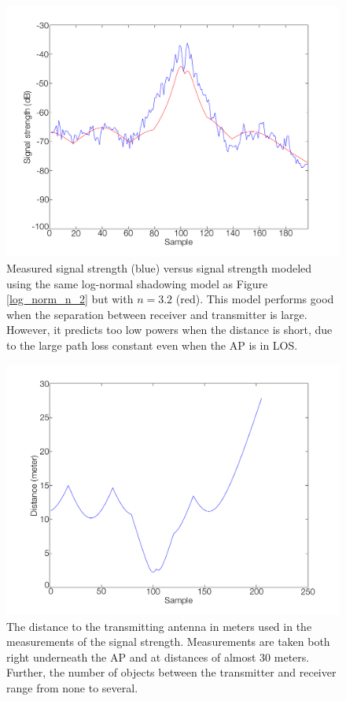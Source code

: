 \documentclass{LTHthesis}
\begin{document}
\begin{figure}[!hbt]

\includegraphics[width=1\textwidth ]{images/signal_model/log_norm_n_3_2}
\caption{Measured signal strength (blue) versus signal strength modeled using the same log-normal shadowing model as Figure \ref{log_norm_n_2} but with $n=3.2$ (red). This model performs good when the separation between receiver and transmitter is large. However, it predicts too low powers when the distance is short, due to the large path loss constant even when the AP is in LOS. }\label{log_norm_n_3_2}
\end{figure}
%
\begin{figure}[!hbt]

\includegraphics[width=1\textwidth ]{images/signal_model/dist_trans}
\caption{The distance to the transmitting antenna in meters used in the measurements of the signal strength. Measurements are taken both right underneath the AP and at distances of almost 30 meters. Further, the number of objects between the transmitter and receiver range from none to several.}\label{dist_trans}
\end{figure}
\end{document}
